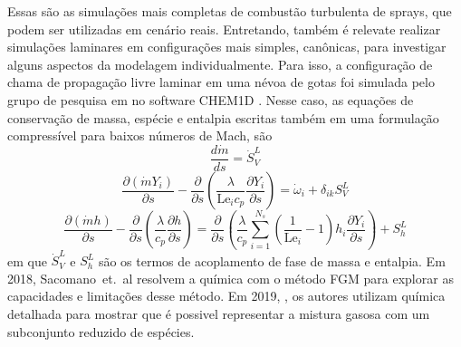 Essas são as simulações mais completas de combustão turbulenta de sprays, que podem ser utilizadas em cenário reais.%
Entretando, também é relevate realizar simulações laminares em configurações mais simples, canônicas, para investigar alguns aspectos da modelagem individualmente. 
Para isso, a configuração de chama de propagação livre laminar em uma névoa de gotas foi simulada pelo grupo de pesquisa em \cite{SacomanoF2018CTM, SacomanoF2019IJHMT} no software CHEM1D \cite{Sommers1994PhD}.
Nesse caso, as equações de conservação de massa, espécie e entalpia escritas também em uma formulação compressível para baixos números de Mach, são \cite{SacomanoF2018CTM,SacomanoF2021Fluids,vanOijen2002CTM,vanOijen2016PECS}
\begin{equation}
    \frac{d \dot m}{d s} = \dot S_V^L
\end{equation}
\begin{equation}
    \frac{\partial(\dot m Y_i)}{\partial s} -
    \frac{\partial}{\partial s} \left(
        \frac{\lambda}{\mathrm{Le}_i c_p} \frac{\partial Y_i}{\partial s}
    \right) =
    \dot \omega_i + \delta_{ik}S_V^L
\end{equation}
\begin{equation}
    \frac{\partial(\dot m h)}{\partial s}
    -
    \frac{\partial}{\partial s} \left(\frac{\lambda}{c_p} \frac{\partial h}{\partial s} \right)
    =
    \frac{\partial}{\partial s} \left(
            \frac{\lambda}{c_p}\sum_{i=1}^{N_s}
            \left(\frac{1}{\mathrm{Le}_i}-1\right)
            h_i \frac{\partial Y_i}{\partial s} 
        \right)
        +
    S_h^L
\end{equation}
em que $\dot S_V^L$ e $S_h^L$ são os termos de acoplamento de fase de massa e entalpia.
Em 2018, Sacomano~et.~al \cite{SacomanoF2018CTM} resolvem a química com o método FGM para explorar as capacidades e limitações desse método.
Em 2019, \cite{SacomanoF2019IJHMT}, os autores utilizam química detalhada para mostrar que é possivel representar a mistura gasosa com um subconjunto reduzido de espécies.  

